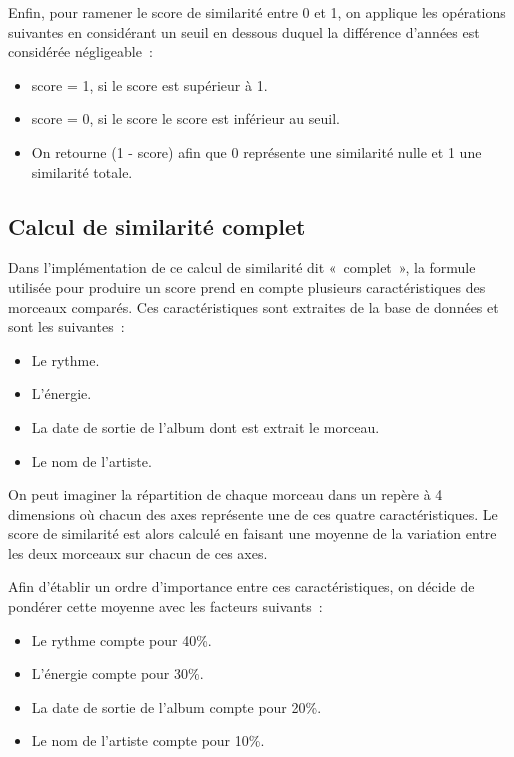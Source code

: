 Enfin, pour ramener le score de similarité entre 0 et 1, on applique les
opérations suivantes en considérant un seuil en dessous duquel la différence
d'années est considérée négligeable~:

\begin{itemize}
\item score = 1, si le score est supérieur à 1. 
\item score = 0, si le score le score est inférieur au seuil.
\item On retourne (1 - score) afin que 0 représente une similarité nulle et 1
une similarité totale.
\end{itemize}

\subsection{Calcul de similarité complet}
\label{impl:similarite:complet}

Dans l'implémentation de ce calcul de similarité dit «~complet~», la formule
utilisée pour produire un score prend en compte plusieurs caractéristiques des
morceaux comparés. Ces caractéristiques sont extraites de la base de données
et sont les suivantes~:

\begin{itemize}
\item Le rythme.
\item L'énergie.
\item La date de sortie de l'album dont est extrait le morceau.
\item Le nom de l'artiste.
\end{itemize}

On peut imaginer la répartition de chaque morceau dans un repère à 4
dimensions où chacun des axes représente une de ces quatre caractéristiques.
Le score de similarité est alors calculé en faisant une moyenne de la
variation entre les deux morceaux sur chacun de ces axes.

Afin d'établir un ordre d'importance entre ces caractéristiques, on décide de
pondérer cette moyenne avec les facteurs suivants~:

\begin{itemize}
\item Le rythme compte pour 40\%.
\item L'énergie compte pour 30\%.
\item La date de sortie de l'album compte pour 20\%.
\item Le nom de l'artiste compte pour 10\%.
\end{itemize}

